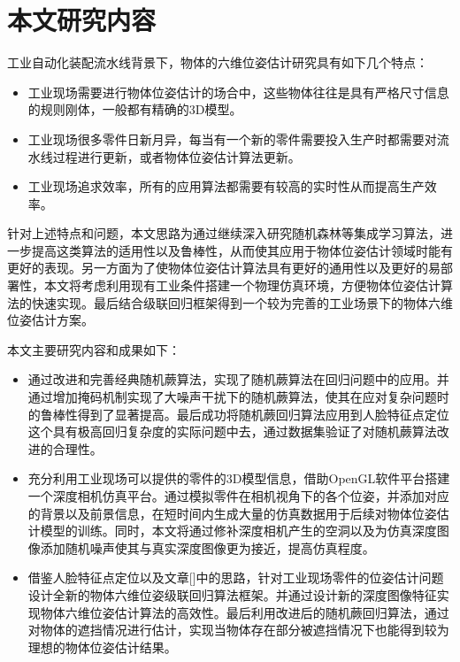 \section{本文研究内容}

工业自动化装配流水线背景下，物体的六维位姿估计研究具有如下几个特点：
\begin{itemize}
\item 工业现场需要进行物体位姿估计的场合中，这些物体往往是具有严格尺寸信息的规则刚体，一般都有精确的3D模型。
\item 工业现场很多零件日新月异，每当有一个新的零件需要投入生产时都需要对流水线过程进行更新，或者物体位姿估计算法更新。
\item 工业现场追求效率，所有的应用算法都需要有较高的实时性从而提高生产效率。
\end{itemize}
针对上述特点和问题，本文思路为通过继续深入研究随机森林等集成学习算法，进一步提高这类算法的适用性以及鲁棒性，从而使其应用于物体位姿估计领域时能有更好的表现。另一方面为了使物体位姿估计算法具有更好的通用性以及更好的易部署性，本文将考虑利用现有工业条件搭建一个物理仿真环境，方便物体位姿估计算法的快速实现。最后结合级联回归框架得到一个较为完善的工业场景下的物体六维位姿估计方案。

本文主要研究内容和成果如下：
\begin{itemize}
\item 通过改进和完善经典随机蕨算法，实现了随机蕨算法在回归问题中的应用。并通过增加掩码机制实现了大噪声干扰下的随机蕨算法，使其在应对复杂问题时的鲁棒性得到了显著提高。最后成功将随机蕨回归算法应用到人脸特征点定位这个具有极高回归复杂度的实际问题中去，通过数据集验证了对随机蕨算法改进的合理性。
\item 充分利用工业现场可以提供的零件的3D模型信息，借助OpenGL软件平台搭建一个深度相机仿真平台。通过模拟零件在相机视角下的各个位姿，并添加对应的背景以及前景信息，在短时间内生成大量的仿真数据用于后续对物体位姿估计模型的训练。同时，本文将通过修补深度相机产生的空洞以及为仿真深度图像添加随机噪声使其与真实深度图像更为接近，提高仿真程度。
\item 借鉴人脸特征点定位以及文章[]中的思路，针对工业现场零件的位姿估计问题设计全新的物体六维位姿级联回归算法框架。并通过设计新的深度图像特征实现物体六维位姿估计算法的高效性。最后利用改进后的随机蕨回归算法，通过对物体的遮挡情况进行估计，实现当物体存在部分被遮挡情况下也能得到较为理想的物体位姿估计结果。
\end{itemize}


